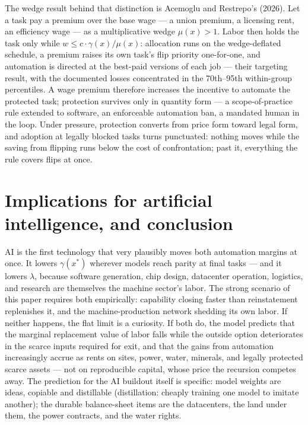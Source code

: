 \documentclass[12pt]{article}
\theoremstyle{plain}
\begin{document}
The wedge result behind that distinction is Acemoglu and Restrepo's (2026). Let a task pay a premium over the base wage --- a union premium, a licensing rent, an efficiency wage --- as a multiplicative wedge $\mu (x) > 1$. Labor then holds the task only while $w \le c\cdot \gamma (x)/\mu (x)$: allocation runs on the wedge-deflated schedule, a premium raises its own task's flip priority one-for-one, and automation is directed at the best-paid versions of each job --- their targeting result, with the documented losses concentrated in the 70th--95th within-group percentiles. A wage premium therefore increases the incentive to automate the protected task; protection survives only in quantity form --- a scope-of-practice rule extended to software, an enforceable automation ban, a mandated human in the loop. Under pressure, protection converts from price form toward legal form, and adoption at legally blocked tasks turns punctuated: nothing moves while the saving from flipping runs below the cost of confrontation; past it, everything the rule covers flips at once.

\section{Implications for artificial intelligence, and conclusion}\label{sec:ai}

AI is the first technology that very plausibly moves both automation margins at once. It lowers $\gamma (x^*)$ wherever models reach parity at final tasks --- and it lowers $\lambda$, because software generation, chip design, datacenter operation, logistics, and research are themselves the machine sector's labor. The strong scenario of this paper requires both empirically: capability closing faster than reinstatement replenishes it, and the machine-production network shedding its own labor. If neither happens, the flat limit is a curiosity. If both do, the model predicts that the marginal replacement value of labor falls while the outside option deteriorates in the scarce inputs required for exit, and that the gains from automation increasingly accrue as rents on sites, power, water, minerals, and legally protected scarce assets --- not on reproducible capital, whose price the recursion competes away. The prediction for the AI buildout itself is specific: model weights are ideas, copiable and distillable (distillation: cheaply training one model to imitate another); the durable balance-sheet items are the datacenters, the land under them, the power contracts, and the water rights.
\end{document}
